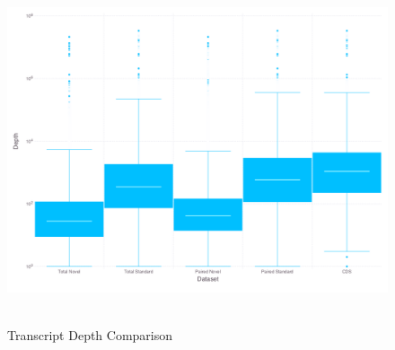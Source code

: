 \begin{figure}
\small
\begin{center}
\includegraphics[width=\textwidth,height=4in]{images/Assembly/Comparison/PairvsTot_boxplot.png}
\end{center}
\caption{Transcript Depth Comparison}\label{fig:5.1}
\end{figure}


